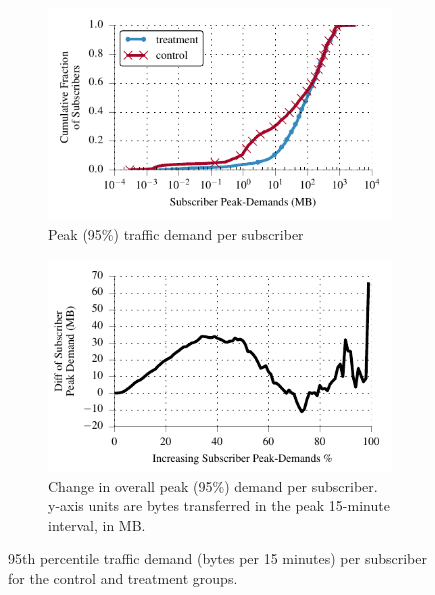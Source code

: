 \begin{figure}[t]
\begin{minipage}{\linewidth}
\centering
%
%
\begin{subfigure}[b]{.49\linewidth}
\includegraphics[width=\linewidth]{figures/cdf_peak_demand-overall.pdf}
               \caption{Peak (95\%) traffic demand per subscriber\label{fig:CDF-data-rate-perc95}}
\end{subfigure}
\begin{subfigure}[b]{.49\linewidth}
\includegraphics[width=\linewidth]{figures/diff_perc95_bytes_subsc-overall_01.pdf}		%
               \caption{
                 Change in overall peak (95\%) demand per subscriber. y-axis units
                  are bytes transferred in the peak 15-minute
                  interval, in MB.
 \label{fig:diff-peak-overall}}
\end{subfigure}
%
\end{minipage}
\caption{95th percentile traffic demand (bytes per 15 minutes) per
  subscriber for the control and treatment groups. \label{fig:traffic-demand-overall}}
\end{figure}

